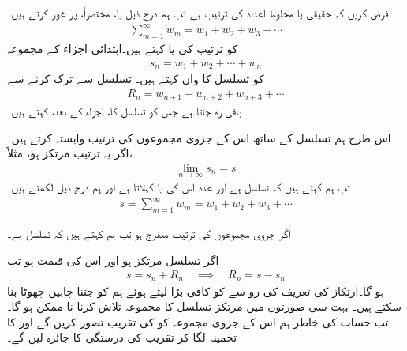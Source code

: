 فرض کریں کہ  حقیقی یا مخلوط اعداد کی ترتیب ہے۔تب ہم درج ذیل  یا، مختصراً،  پر غور کرتے ہیں۔
\begin{align}\label{مساوات_ترتیب_تسلسل_الف}
\sum_{m=1}^{\infty} w_m=w_1+w_2+w_3+\cdots
\end{align}
 کو ترتیب کی  یا   کہتے ہیں۔ابتدائی  اجزاء کے مجموعہ
\begin{align}\label{مساوات_ترتیب_تسلسل_ب}
s_n=w_1+w_2+\cdots+w_n
\end{align}
کو تسلسل  کا  واں  کہتے ہیں۔ تسلسل  سے   ترک کرنے سے
\begin{align}
R_n=w_{n+1}+w_{n+2}+w_{n+3}+\cdots
\end{align}
باقی رہ جاتا ہے جس کو تسلسل  کا،  اجزاء کے بعد،  کہتے ہیں۔ 

اس طرح ہم تسلسل  کے ساتھ اس کے جزوی مجموعوں  کی ترتیب وابستہ کرتے ہیں۔اگر یہ ترتیب مرتکز ہو، مثلاً،
\begin{align*}
\lim_{n\to \infty} s_n=s
\end{align*}
تب ہم کہتے ہیں کہ تسلسل   ہے اور عدد  اس کی  یا  کہلاتا ہے اور ہم درج ذیل لکھتے ہیں۔
\begin{align*}
s=\sum_{m=1}^{\infty} w_m=w_1+w_2+w_3+\cdots
\end{align*}

اگر جزوی مجموعوں کی ترتیب منفرج ہو تب ہم کہتے ہیں کہ تسلسل     ہے۔

اگر تسلسل  مرتکز ہو اور اس کی قیمت  ہو تب
\begin{align}
s=s_n+R_n\quad \implies \quad R_n=s-s_n
\end{align}
ہو گا۔ارتکاز کی تعریف کی رو سے  کو کافی بڑا لیتے ہوئے  ہم  کو جتنا چاہیں چھوٹا بنا سکتے ہیں۔ بہت سی صورتوں میں مرتکز تسلسل کا مجموعہ  تلاش کرنا نا ممکن ہو گا۔تب حساب کی خاطر ہم اس کے جزوی مجموعہ  کو  کی تقریب تصور کریں گے اور  کا تخمینہ لگا کر  تقریب کی درستگی کا جائزہ لیں گے۔

